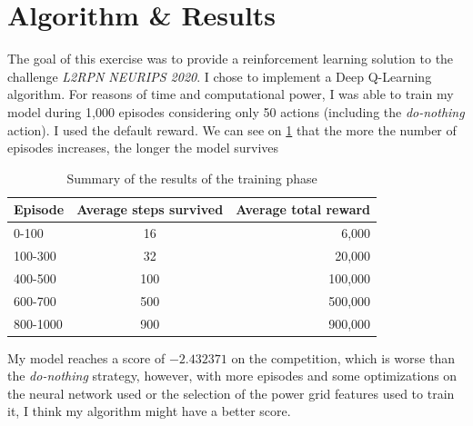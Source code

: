 \documentclass[a4paper]{article}
\begin{document}
\section{Algorithm \& Results}
The goal of this exercise was to provide a reinforcement learning solution to the challenge
\textit{L2RPN NEURIPS 2020}\cite{L2RPN}. I chose to implement a Deep Q-Learning algorithm.
For reasons of time and computational power, I was able to train my model during 1,000 episodes
considering only 50 actions (including the \textit{do-nothing} action). I used the default reward.
We can see on \ref{table:results} that the more the number of episodes increases, the longer the model survives
\begin{table}[H]
  \centering
  \begin{tabular}{|l|c|r|}
    \hline
    Episode & Average steps survived & Average total reward \\
    \hline
    0-100 & 16 & 6,000 \\
    \hline
    100-300 & 32 & 20,000 \\
    \hline
    400-500 & 100 & 100,000\\
    \hline
    600-700 & 500 & 500,000\\
    \hline
    800-1000 & 900 & 900,000\\
    \hline
  \end{tabular}
  \caption{Summary of the results of the training phase}
  \label{table:results}
\end{table}

My model reaches a score of $-2.432371$ on the competition, which is worse than the \textit{do-nothing}
strategy, however, with more episodes and some optimizations on the neural network
used or the selection of the power grid features used to train it,
I think my algorithm might have a better score.
\end{document}
